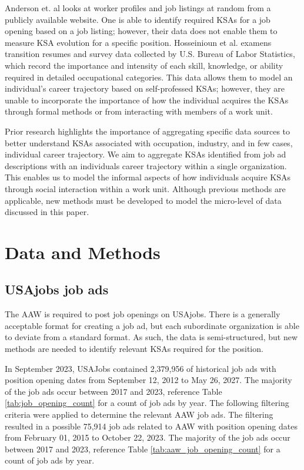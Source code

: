 \documentclass[12pt]{article}
\begin{document}
Anderson et. al looks at worker profiles and job listings at random from a publicly available website.\cite{anderson2017skill} One is able to identify required KSAs for a job opening based on a job listing; however, their data does not enable them to measure KSA evolution for a specific position. Hosseinioun et al. examens transition resumes and survey data collected by U.S. Bureau of Labor Statistics, which record the importance and intensity of each skill, knowledge, or ability required in detailed occupational categories.\cite{nested_skills} This data allows them to model an individual's career trajectory based on self-professed KSAs; however, they are unable to incorporate the importance of how the individual acquires the KSAs through formal methods or from interacting with members of a work unit.

Prior research highlights the importance of aggregating specific data sources to better understand KSAs associated with occupation, industry, and in few cases, individual career trajectory. We aim to aggregate KSAs identified from job ad descriptions with an individuals career trajectory within a single organization. This enables us to model the informal aspects of how individuals acquire KSAs through social interaction within a work unit. Although previous methods are applicable, new methods must be developed to model the micro-level of data discussed in this paper.

\section{Data and Methods}

\subsection{USAjobs job ads}

The AAW is required to post job openings on USAjobs. There is a generally acceptable format for creating a job ad, but each subordinate organization is able to deviate from a standard format. As such, the data is semi-structured, but new methods are needed to identify relevant KSAs required for the position. 

In September 2023, USAJobs contained 2,379,956 of historical job ads with position opening dates from September 12, 2012 to May 26, 2027. The majority of the job ads occur between 2017 and 2023, reference Table \ref{tab:job_opening_count} for a count of job ads by year. The following filtering criteria were applied to determine the relevant AAW job ads. The filtering resulted in a possible 75,914 job ads related to AAW with position opening dates from February 01, 2015 to October 22, 2023. The majority of the job ads occur between 2017 and 2023, reference Table \ref{tab:aaw_job_opening_count} for a count of job ads by year. 
\end{document}
